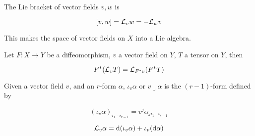 \begin{definition}

    The Lie bracket of vector fields \(v, w\) is

    \[[v, w] = \mathcal{L}_vw = -\mathcal{L}_w v\]

    This makes the space of vector fields on \(X\) into a Lie algebra.
\end{definition}

\begin{lemma}
    Let \(F : X \to Y\) be a diffeomorphism, \(v\) a vector field on \(Y\), \(T\) a tensor on \(Y\), then

    \[F^*(\mathcal{L}_vT) = \mathcal{L}_{F^*v}(F^*T)\]
\end{lemma}

\begin{definition}
    Given a vector field \(v\), and an \(r\)-form \(\alpha\), \(\iota_v\alpha\) or \(v\lrcorner\alpha\) is the \((r-1)\)-form defined by

    \[(\iota_v\alpha)_{i_1\cdots i_{r-1}} = v^j\alpha_{ji_1\cdots i_{r-1}}\]
\end{definition}

\begin{proposition}

    \[\mathcal{L}_v\alpha = \dd(\iota_v\alpha) + \iota_v(\dd\alpha)\]
\end{proposition}
